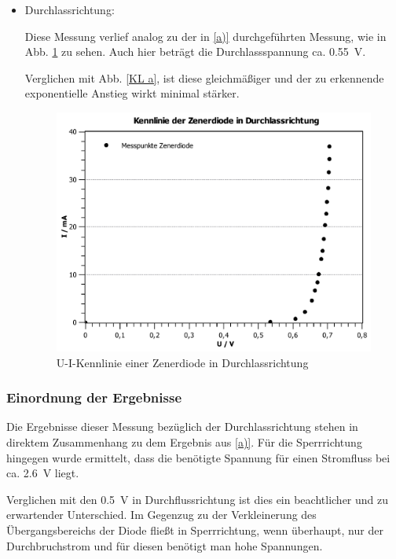 \documentclass[11pt,a4paper,titlepage, ngerman]{article}
\begin{document}
\begin{itemize}
				 	\item Durchlassrichtung:  
				 	
				 	Diese Messung verlief analog zu der in \ref{a)} durchgeführten Messung, wie in Abb. \ref{KL b2} zu sehen.
				 	Auch hier beträgt die Durchlassspannung ca. \SI{0,55}{\V}.

				 	Verglichen mit Abb. \ref{KL a}, ist diese gleichmäßiger und der zu erkennende exponentielle Anstieg wirkt minimal stärker.
				 	
				 	\begin{figure}
				 		\centering
				 		\includegraphics[width=\textwidth]{KennlinieZenerdiodeDurchlassrichtung.pdf}
				 		\caption{U-I-Kennlinie einer Zenerdiode in Durchlassrichtung}
				 		\label{KL b2}
				 	\end{figure}
				 					 	
				\end{itemize}
											
			\subsubsection*{Einordnung der Ergebnisse}
				
				Die Ergebnisse dieser Messung bezüglich der Durchlassrichtung stehen in direktem Zusammenhang zu dem Ergebnis aus \ref{a)}. 
				Für die Sperrrichtung hingegen wurde ermittelt, dass die benötigte Spannung für einen Stromfluss bei ca. \SI{2.6}{\V} liegt. 
				
				Verglichen mit den \SI{0.5}{\V} in Durchflussrichtung ist dies ein beachtlicher und zu erwartender Unterschied.
				Im Gegenzug zu der Verkleinerung des Übergangsbereichs der Diode fließt in Sperrrichtung, wenn überhaupt, nur der Durchbruchstrom und für diesen benötigt man hohe Spannungen. 
				
\end{document}

